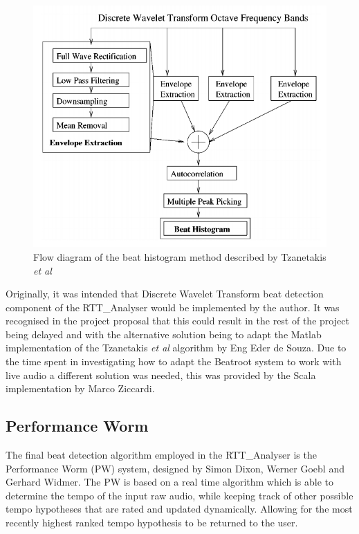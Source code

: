 \documentclass[a4paper, 11pt]{article}
\begin{document}
\begin{figure}[ht]
	\centering
	\includegraphics[scale=0.25]{images/dwtflow.jpg}
	\caption{Flow diagram of the beat histogram method described by Tzanetakis \textit{et al}\cite{tzane3}}
	\label{fig: dwtFlow}
\end{figure}


Originally, it was intended that Discrete Wavelet Transform beat detection component of the RTT\_Analyser would be implemented by the author. It was recognised in the project proposal that this could result in the rest of the project being delayed and with the alternative solution being to adapt the Matlab implementation of the Tzanetakis \textit{et al}\cite{tzane1} algorithm by Eng Eder de Souza\cite{desouze}. Due to the time spent in investigating how to adapt the Beatroot system to work with live audio a different solution was needed, this was provided by the Scala implementation by Marco Ziccardi\cite{marcoZin}.

\subsection{Performance Worm}
The final beat detection algorithm employed in the RTT\_Analyser is the Performance Worm (PW) system, designed by Simon Dixon, Werner Goebl and Gerhard Widmer\cite{dixonGoeblWidmer}. The PW is based on a real time algorithm which is able to determine the tempo of the input raw audio, while keeping track of other possible tempo hypotheses that are rated and updated dynamically. Allowing for the most recently highest ranked tempo hypothesis to be returned to the user\cite{dixonGoeblWidmer}. 
\end{document}
